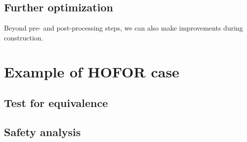 \documentclass{article}
\begin{document}
\subsection{Further optimization}

Beyond pre- and post-processing steps, we can also make improvements during
construction.

\section{Example of HOFOR case}

\subsection{Test for equivalence}

\subsection{Safety analysis}
\end{document}
